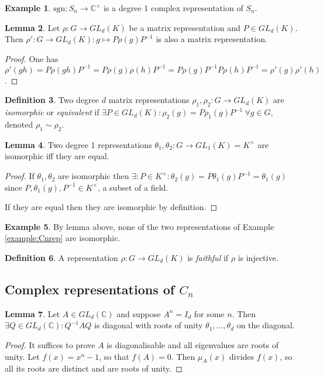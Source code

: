 \documentclass{article}
\newcommand{\sgn}{\text{sgn}}
\newcommand{\C}{\mathbb{C}}
\theoremstyle{definition}
\newtheorem{defn}{Definition}[subsection]
\newtheorem{lemma}[defn]{Lemma}
\newtheorem{example}[defn]{Example}
\begin{document}
\begin{example}
$\sgn:S_n\rightarrow \C^\times$ is a degree 1 complex representation of $S_n$.
\end{example}

\begin{lemma}
Let $\rho:G\rightarrow GL_d(K)$ be a matrix representation and $P\in GL_d(K)$. Then $\rho':G\rightarrow GL_d(K):g\mapsto P\rho(g)P^{-1}$ is also a matrix representation.
\end{lemma}
\begin{proof}
One has $\rho'(gh)=P\rho(gh)P^{-1}=P\rho(g)\rho(h)P^{-1}=P\rho(g)P^{-1}P\rho(h)P^{-1}=\rho'(g)\rho'(h)$.
\end{proof}

\begin{defn}
Two degree $d$ matrix representations $\rho_1,\rho_2:G\rightarrow GL_d(K)$ are \textit{isomorphic} or \textit{equivalent} if $\exists P\in GL_d(K):\rho_2(g)=P\rho_1(g)P^{-1} \ \forall g\in G$, denoted $\rho_1\sim\rho_2$.
\end{defn}

\begin{lemma}
Two degree 1 representations $\theta_1,\theta_2:G\rightarrow GL_1(K)=K^\times$ are isomorphic iff they are equal.
\end{lemma}
\begin{proof}
If $\theta_1,\theta_2$ are isomorphic then $\exists:P\in K^\times:\theta_2(g)=P\theta_1(g)P^{-1}=\theta_1(g)$ since $P,\theta_1(g),P^{-1}\in K^\times$, a subset of a field.

If they are equal then they are isomorphic by definition.
\end{proof}

\begin{example}
By lemma above, none of the two representations of Example \ref{example:Cnrep} are isomorphic.
\end{example}

\begin{defn}
A representation $\rho:G\rightarrow GL_d(K)$ is \textit{faithful} if $\rho$ is injective.
\end{defn}

\subsection{Complex representations of $C_n$}
\begin{lemma}
\label{lemma:finordmatdiagevrou}
Let $A\in GL_d(\C)$ and suppose $A^n=I_d$ for some $n$. Then $\exists Q\in GL_d(\C):Q^{-1}AQ$ is diagonal with roots of unity $\theta_1,\ldots,\theta_d$ on the diagonal.
\end{lemma}
\begin{proof}
It suffices to prove $A$ is diagonalisable and all eigenvalues are roots of unity. Let $f(x)=x^n-1$, so that $f(A)=0$. Then $\mu_A(x)$ divides $f(x)$, so all its roots are distinct and are roots of unity.
\end{proof}
\end{document}
